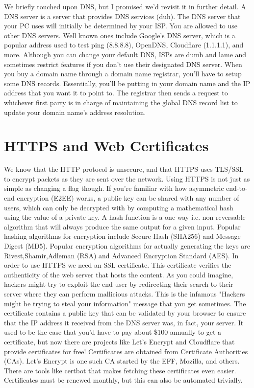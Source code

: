 \documentclass{article}
\begin{document}
We briefly touched upon DNS, but I promised we'd revisit it in further detail. A DNS server is a server that
provides DNS services (duh). The DNS server that your PC uses will initially be determined by your ISP. You are
allowed to use other DNS servers. Well known ones include Google's DNS server, which is a popular address used
to test ping (8.8.8.8), OpenDNS, Cloudflare (1.1.1.1), and more. Although you can change your default DNS, ISPs
are dumb and lame and sometimes restrict features if you don't use their designated DNS server. When you buy a
domain name through a domain name registrar, you'll have to setup some DNS records. Essentially, you'll be
putting in your domain name and the IP address that you want it to point to. The registrar then sends a request
to whichever first party is in charge of maintaining the global DNS record list to update your domain name's
address resolution.

\section{HTTPS and Web Certificates}

We know that the HTTP protocol is unsecure, and that HTTPS uses TLS/SSL to encrypt packets as they are sent over
the network. Using HTTPS is not just as simple as changing a flag though. If you're familiar with how
asymmetric end-to-end encryption (E2EE) works, a public key can be shared with any number of users, which can
only be decrypted with by computing a mathematical hash using the value of a private key. A hash function is a
one-way i.e. non-reversable algorithm that will always produce the same output for a given input. Popular
hashing algorithms for encryption include Secure Hash (SHA256) and Message Digest (MD5). Popular encryption
algorithms for actually generating the keys are Rivest,Shamir,Adleman (RSA) and Advanced Encryption Standard
(AES). In order to use HTTPS we need an SSL certificate. This certificate verifies the authenticity of the web
server that hosts the content. As you could imagine, hackers might try to exploit the end user by redirecting
their search to their server where they can perform mallicious attacks. This is the infamous "Hackers might be
trying to steal your information" message that you get sometimes. The certificate contains a public key that
can be validated by your browser to ensure that the IP address it received from the DNS server was, in fact,
your server. It used to be the case that you'd have to pay about \$100 annually to get a certificate, but now
there are projects like Let's Encrypt and Cloudflare that provide certificates for free! Certificates are
obtained from Certificate Authorities (CAs). Let's Encrypt is one such CA started by the EFF, Mozilla, and
others. There are tools like certbot that makes fetching these certificates even easier. Certificates must be
renewed monthly, but this can also be automated trivially.
\end{document}

